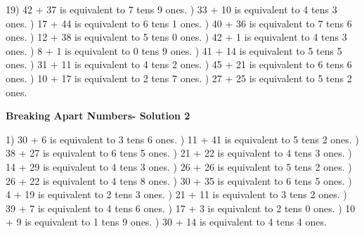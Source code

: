 \documentclass{article}%
\begin{document}
19) 42 + 37 is equivalent to 7 tens 9 ones.%
) 33 + 10 is equivalent to 4 tens 3 ones.%
) 17 + 44 is equivalent to 6 tens 1 ones.%
) 40 + 36 is equivalent to 7 tens 6 ones.%
) 12 + 38 is equivalent to 5 tens 0 ones.%
) 42 + 1 is equivalent to 4 tens 3 ones.%
) 8 + 1 is equivalent to 0 tens 9 ones.%
) 41 + 14 is equivalent to 5 tens 5 ones.%
) 31 + 11 is equivalent to 4 tens 2 ones.%
) 45 + 21 is equivalent to 6 tens 6 ones.%
) 10 + 17 is equivalent to 2 tens 7 ones.%
) 27 + 25 is equivalent to 5 tens 2 ones.%
\newline%
\newpage%
\large%
\begin{center}%
\textbf{Breaking Apart Numbers- Solution 2}%
\newline%
\end{center} \normalsize%
1) 30 + 6 is equivalent to 3 tens 6 ones.%
) 11 + 41 is equivalent to 5 tens 2 ones.%
) 38 + 27 is equivalent to 6 tens 5 ones.%
) 21 + 22 is equivalent to 4 tens 3 ones.%
) 14 + 29 is equivalent to 4 tens 3 ones.%
) 26 + 26 is equivalent to 5 tens 2 ones.%
) 26 + 22 is equivalent to 4 tens 8 ones.%
) 30 + 35 is equivalent to 6 tens 5 ones.%
) 4 + 19 is equivalent to 2 tens 3 ones.%
) 21 + 11 is equivalent to 3 tens 2 ones.%
) 39 + 7 is equivalent to 4 tens 6 ones.%
) 17 + 3 is equivalent to 2 tens 0 ones.%
) 10 + 9 is equivalent to 1 tens 9 ones.%
) 30 + 14 is equivalent to 4 tens 4 ones.%
\end{document}
